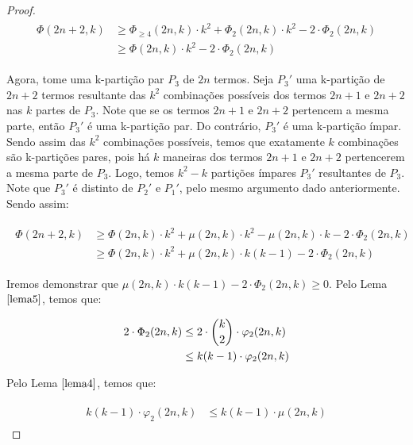 \documentclass[12pt]{article}
\begin{document}
\begin{proof}
  	\begin{align}
  		\begin{split}
  			\Phi(2n+2, k) &\geq \Phi_{\geq 4}(2n, k) \cdot k^2 + \Phi_{2}(2n, k) \cdot k^2 - 2 \cdot \Phi_{2}(2n, k) \\
  			&\geq \Phi(2n, k) \cdot k^2 - 2 \cdot \Phi_2(2n, k)
  		\end{split} 
  	\end{align}  

  	Agora, tome uma k-partição par $P_3$ de $2n$ termos. Seja $P_3'$ uma k-partição de $2n+2$ termos resultante das $k^2$ combinações possíveis dos termos $2n+1$ e $2n+2$ nas $k$ partes de $P_3$. Note que se os termos $2n+1$ e $2n+2$ pertencem a mesma parte, então $P_3'$ é uma k-partição par. Do contrário, $P_3'$ é uma k-partição ímpar. Sendo assim das $k^2$ combinações possíveis, temos que exatamente $k$ combinações são k-partições pares, pois há $k$ maneiras dos termos $2n+1$ e $2n+2$ pertencerem a mesma parte de $P_3$. Logo, temos $k^2 - k$ partições ímpares $P_3'$ resultantes de $P_3$. Note que $P_3'$ é distinto de $P_2'$ e $P_1'$, pelo mesmo argumento dado anteriormente. Sendo assim: 	
  	
  	\begin{align}
  		\begin{split}
  			\Phi(2n+2, k) &\geq \Phi(2n, k) \cdot k^2 + \mu(2n, k)\cdot k^2 - \mu(2n, k) \cdot k - 2 \cdot \Phi_2(2n, k) \\
  			&\geq  \Phi(2n, k) \cdot k^2 + \mu(2n, k)\cdot k  (k-1) - 2 \cdot \Phi_2(2n, k)
  		\end{split} 
  	\end{align}  
  	 
  	 Iremos demonstrar que $\mu(2n, k)\cdot k  (k-1) - 2 \cdot \Phi_2(2n, k) \geq 0$. Pelo Lema $\ref{lema5}$, temos que: 
  	 
  	 \begin{align}
  	 	\begin{split}
  	 	 2 \cdot \Phi_2(2n, k) &\leq 2 \cdot \escolhe{k}{2} \cdot \varphi_2(2n, k) \\
  	 	 & \leq k(k-1) \cdot \varphi_2(2n, k)
  	 	\end{split} 
  	 \end{align}  
  	 
  	 Pelo Lema $\ref{lema4}$, temos que: 
  	 
  	 \begin{align}
  	 	\begin{split}
  	 		 k(k-1) \cdot \varphi_2(2n, k) &\leq k(k-1) \cdot \mu(2n, k)
  	 	\end{split} 
  	 \end{align}  
  	 

\end{proof}
\end{document}
